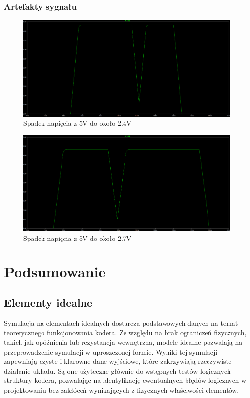 \documentclass{article}
\begin{document}
\subsubsection{Artefakty sygnału}
\begin{figure}[ht]
    \centering
    \begin{adjustbox}{center}
        \includegraphics[width=1\textwidth]{popsute1.png}
    \end{adjustbox}
    \caption{Spadek napięcia z 5V do około 2.4V}
    \label{fig:mojobrazek}
\end{figure}

\begin{figure}[ht]
    \centering
    \begin{adjustbox}{center}
        \includegraphics[width=1\textwidth]{popsute2.png}
    \end{adjustbox}
    \caption{Spadek napięcia z 5V do około 2.7V}
    \label{fig:mojobrazek}
\end{figure}

\newpage
\section{Podsumowanie}
\subsection {Elementy idealne}
Symulacja na elementach idealnych dostarcza podstawowych danych na temat teoretycznego funkcjonowania kodera. Ze względu na brak ograniczeń fizycznych, takich jak opóźnienia lub rezystancja wewnętrzna, modele idealne pozwalają na przeprowadzenie symulacji w uproszczonej formie. Wyniki tej symulacji zapewniają czyste i klarowne dane wyjściowe, które zakrzywiają rzeczywiste działanie układu. Są one użyteczne głównie do wstępnych testów logicznych struktury kodera, pozwalając na identyfikację ewentualnych błędów logicznych w projektowaniu bez zakłóceń wynikających z fizycznych właściwości elementów.
\end{document}
